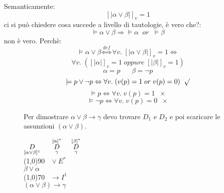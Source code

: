 \documentclass{article}
\theoremstyle{break}
\theoremstyle{break}
\theoremstyle{break}
\theoremstyle{break}
\begin{document}
Semanticamente:
\[
    [|\alpha \vee \beta|]_v=1
\] 
ci si può chiedere cosa succede a livello di tautologie, è vero che?:
\[
\models \alpha \vee \beta \Rightarrow \models \alpha\;\;or\;\; \models \beta
\] 
non è vero. Perchè:
\[
    \models \alpha \vee \beta \stackrel{def}{\Leftrightarrow} \forall v.\; [|\alpha \vee \beta|]_v=1 \Leftrightarrow
\] 
\[
    \forall v.\; ([|\alpha|]_v=1 \; oppure\; [|\beta|]_v=1)
\] 
\[
\alpha = p \;\;\;\;\;\; \beta = \neg p
\] 
\[
\models p \vee \neg p \Leftrightarrow \forall v.\; (v(p) = 1 \; or\; v(p) = 0)\;\; \surd
\] 
\[
\models p \Leftrightarrow \forall v. \; v(p) = 1\;\; \times
\] 
\[
\models \neg p \Leftrightarrow \forall v. \; v(p) = 0\;\; \times
\] 
\begin{figure}[H]
    \begin{example}
        Per dimostrare \( \alpha \vee \beta \to \gamma \) devo trovare \( D_1 \) e \( D_2 \) e poi scaricare le
        assunzioni \( (\alpha \vee \beta) \).

        \begin{center}
            \( \underset{[\alpha \vee \beta]^1}{D} \hspace{0.5cm} \stackrel{[\alpha]^*}{\underset{\gamma}{D}} \hspace{0.5cm} \stackrel{[\beta]^*}{\underset{\gamma}{D}} \)\\
            \hspace{0.9cm}\line(1,0){90}\(\;\;\; \vee E^* \)\\  
            \( \beta \vee \alpha \)\\
            \hspace{0.9cm}\line(1,0){70}\(\;\;\; \to I^1 \)\\  
            \( (\alpha \vee \beta) \to \gamma \) 
        \end{center}
    \end{example}
\end{figure}
\end{document}
